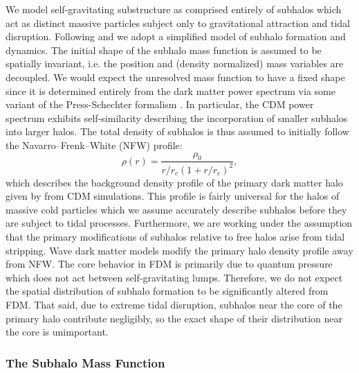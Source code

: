 \documentclass[usenatbib]{mnras}
\begin{document}
We model {\color{magenta} self-gravitating} substructure as comprised entirely of subhalos which act as distinct massive particles subject only to gravitational attraction and tidal disruption. Following \citet{tidal_limit} and \cite{unified_model} we adopt a
simplified model of subhalo
formation and dynamics. { \color{red} The initial shape of the subhalo mass function is assumed to
be spatially invariant, i.e. the position
and (density normalized) mass variables are decoupled. We would expect the unresolved mass function to have a fixed shape since it is determined entirely from the dark matter power spectrum \citep{unified_model} via some variant of the Press-Schechter formalism \citep{press-schechter}. 
In particular, the CDM power spectrum exhibits self-similarity describing the incorporation of smaller subhalos into larger halos. }
The total density of subhalos is thus assumed to initially
follow the Navarro--Frenk--White (NFW) profile:
\begin{equation}
\rho(r) = \frac{\rho_0}{r/r_c (1+r/r_c)^2},
\end{equation} 
which describes the background 
density profile of the
primary dark matter halo given by \citet{structure} from CDM simulations. This profile is fairly universal for the halos of massive cold particles which we assume accurately describe subhalos {\color{magenta} before they are subject to tidal processes.} Furthermore, we are working under the assumption that the primary modifications of subhalos relative to free halos arise from tidal stripping. Wave dark matter models modify the primary halo density profile away from NFW. The core behavior in FDM is primarily due to quantum pressure which does not act between self-gravitating lumps. Therefore, we do not expect the spatial distribution of subhalo formation to be significantly altered from FDM. That said, due to extreme tidal disruption, subhalos near the core of the primary halo contribute negligibly, so the exact shape of their distribution near the core is unimportant.  

\subsubsection{The Subhalo Mass Function}
\end{document}
